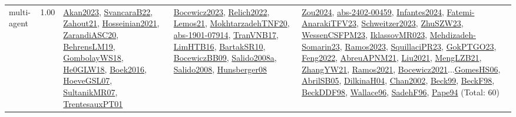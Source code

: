 {\begin{longtable}{p{3cm}r>{\raggedright\arraybackslash}p{6cm}>{\raggedright\arraybackslash}p{6cm}>{\raggedright\arraybackslash}p{8cm}}
\index{multi-agent}\index{Concepts!multi-agent}multi-agent &  1.00 & \hyperref[detail:Akan2023]{Akan2023}, \hyperref[detail:SvancaraB22]{SvancaraB22}, \hyperref[detail:Zahout21]{Zahout21}, \hyperref[detail:Hosseinian2021]{Hosseinian2021}, \hyperref[detail:ZarandiASC20]{ZarandiASC20}, \hyperref[detail:BehrensLM19]{BehrensLM19}, \hyperref[detail:GombolayWS18]{GombolayWS18}, \hyperref[detail:He0GLW18]{He0GLW18}, \hyperref[detail:Boek2016]{Boek2016}, \hyperref[detail:HoeveGSL07]{HoeveGSL07}, \hyperref[detail:SultanikMR07]{SultanikMR07}, \hyperref[detail:TrentesauxPT01]{TrentesauxPT01} & \hyperref[detail:Bocewicz2023]{Bocewicz2023}, \hyperref[detail:Relich2022]{Relich2022}, \hyperref[detail:Lemos21]{Lemos21}, \hyperref[detail:MokhtarzadehTNF20]{MokhtarzadehTNF20}, \hyperref[detail:abs-1901-07914]{abs-1901-07914}, \hyperref[detail:TranVNB17]{TranVNB17}, \hyperref[detail:LimHTB16]{LimHTB16}, \hyperref[detail:BartakSR10]{BartakSR10}, \hyperref[detail:BocewiczBB09]{BocewiczBB09}, \hyperref[detail:Salido2008a]{Salido2008a}, \hyperref[detail:Salido2008]{Salido2008}, \hyperref[detail:Hunsberger08]{Hunsberger08} & \hyperref[detail:Zou2024]{Zou2024}, \hyperref[detail:abs-2402-00459]{abs-2402-00459}, \hyperref[detail:Infantes2024]{Infantes2024}, \hyperref[detail:Fatemi-AnarakiTFV23]{Fatemi-AnarakiTFV23}, \hyperref[detail:Schweitzer2023]{Schweitzer2023}, \hyperref[detail:ZhuSZW23]{ZhuSZW23}, \hyperref[detail:WessenCSFPM23]{WessenCSFPM23}, \hyperref[detail:IklassovMR023]{IklassovMR023}, \hyperref[detail:Mehdizadeh-Somarin23]{Mehdizadeh-Somarin23}, \hyperref[detail:Ramos2023]{Ramos2023}, \hyperref[detail:SquillaciPR23]{SquillaciPR23}, \hyperref[detail:GokPTGO23]{GokPTGO23}, \hyperref[detail:Feng2022]{Feng2022}, \hyperref[detail:AbreuAPNM21]{AbreuAPNM21}, \hyperref[detail:Liu2021]{Liu2021}, \hyperref[detail:MengLZB21]{MengLZB21}, \hyperref[detail:ZhangYW21]{ZhangYW21}, \hyperref[detail:Ramos2021]{Ramos2021}, \hyperref[detail:Bocewicz2021]{Bocewicz2021}...\hyperref[detail:GomesHS06]{GomesHS06}, \hyperref[detail:AbrilSB05]{AbrilSB05}, \hyperref[detail:DilkinaH04]{DilkinaH04}, \hyperref[detail:Chan2002]{Chan2002}, \hyperref[detail:Beck99]{Beck99}, \hyperref[detail:BeckF98]{BeckF98}, \hyperref[detail:BeckDDF98]{BeckDDF98}, \hyperref[detail:Wallace96]{Wallace96}, \hyperref[detail:SadehF96]{SadehF96}, \hyperref[detail:Pape94]{Pape94} (Total: 60)\\

\end{longtable}}
